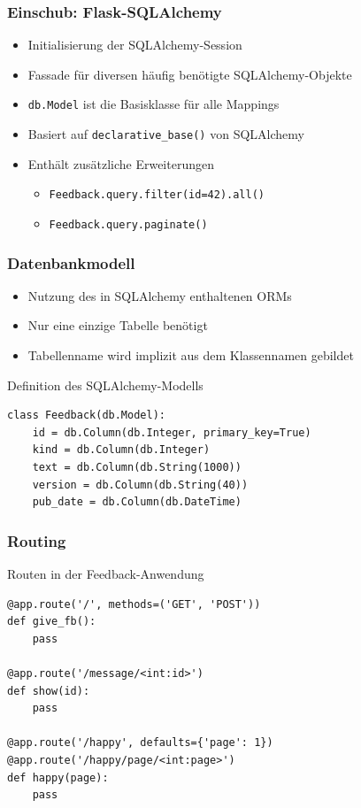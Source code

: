\documentclass{beamer}
\begin{document}
\begin{frame}
  \frametitle{Einschub: Flask-SQLAlchemy}
  \begin{itemize}
    \item Initialisierung der SQLAlchemy-Session
    \item Fassade für diversen häufig benötigte SQLAlchemy-Objekte
    \item \lstinline{db.Model} ist die Basisklasse für alle Mappings
    \item Basiert auf \lstinline{declarative_base()} von SQLAlchemy
    \item Enthält zusätzliche Erweiterungen
      \begin{itemize}
        \item \lstinline{Feedback.query.filter(id=42).all()}
        \item \lstinline{Feedback.query.paginate()}
      \end{itemize}
  \end{itemize}
\end{frame}

\begin{frame}[fragile]
  \frametitle{Datenbankmodell}
  \begin{itemize}
    \item Nutzung des in SQLAlchemy enthaltenen ORMs
    \item Nur eine einzige Tabelle benötigt
    \item Tabellenname wird implizit aus dem Klassennamen gebildet
  \end{itemize}
  \begin{exampleblock}{Definition des SQLAlchemy-Modells}
    \begin{lstlisting}
class Feedback(db.Model):
    id = db.Column(db.Integer, primary_key=True)
    kind = db.Column(db.Integer)
    text = db.Column(db.String(1000))
    version = db.Column(db.String(40))
    pub_date = db.Column(db.DateTime)
    \end{lstlisting}
  \end{exampleblock}
\end{frame}

\begin{frame}[fragile]
  \frametitle{Routing}
  \begin{exampleblock}{Routen in der Feedback-Anwendung}
    \begin{lstlisting}
@app.route('/', methods=('GET', 'POST'))
def give_fb():
    pass

@app.route('/message/<int:id>')
def show(id):
    pass

@app.route('/happy', defaults={'page': 1})
@app.route('/happy/page/<int:page>')
def happy(page):
    pass
    \end{lstlisting}
  \end{exampleblock}
\end{frame}
\end{document}
